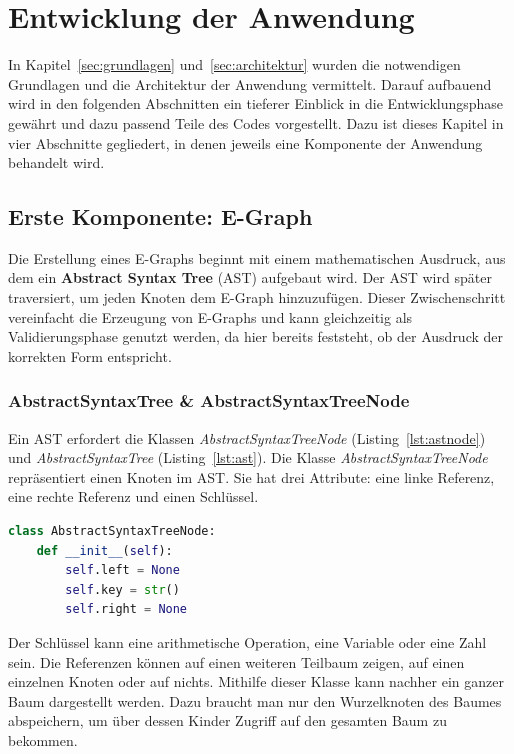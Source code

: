 \section{Entwicklung der Anwendung}\label{sec:entwicklung}

In Kapitel~\ref{sec:grundlagen} und~\ref{sec:architektur} wurden die notwendigen Grundlagen und die Architektur der Anwendung vermittelt.
Darauf aufbauend wird in den folgenden Abschnitten ein tieferer Einblick in die Entwicklungsphase gewährt und dazu passend Teile des Codes vorgestellt.
Dazu ist dieses Kapitel in vier Abschnitte gegliedert, in denen jeweils eine Komponente der Anwendung behandelt wird.

\subsection{Erste Komponente: E-Graph}

Die Erstellung eines E-Graphs beginnt mit einem mathematischen Ausdruck, aus dem ein \textbf{Abstract Syntax Tree} (AST) aufgebaut wird.
Der AST wird später traversiert, um jeden Knoten dem E-Graph hinzuzufügen. Dieser Zwischenschritt vereinfacht die Erzeugung von E-Graphs und
kann gleichzeitig als Validierungsphase genutzt werden, da hier bereits feststeht, ob der Ausdruck der korrekten Form entspricht.

\subsubsection{AbstractSyntaxTree \& AbstractSyntaxTreeNode}

Ein AST erfordert die Klassen \textit{AbstractSyntaxTreeNode} (Listing~\ref{lst:astnode}) und 
\textit{AbstractSyntaxTree} (Listing~\ref{lst:ast}). Die Klasse \textit{AbstractSyntaxTreeNode} repräsentiert
einen Knoten im AST. Sie hat drei Attribute: eine linke Referenz, eine rechte Referenz und einen Schlüssel.

\begin{lstlisting}[language=Python, caption=Klasse \textit{AbstractSyntaxTreeNode}, label={lst:astnode}]
class AbstractSyntaxTreeNode:
    def __init__(self):
        self.left = None
        self.key = str()
        self.right = None
\end{lstlisting}

Der Schlüssel kann eine arithmetische Operation, eine Variable oder eine Zahl sein. Die Referenzen können auf einen weiteren Teilbaum zeigen, auf einen einzelnen Knoten
oder auf nichts. Mithilfe dieser Klasse kann nachher ein ganzer Baum dargestellt werden. Dazu braucht man nur den Wurzelknoten des Baumes abspeichern, um über dessen Kinder
Zugriff auf den gesamten Baum zu bekommen. 

